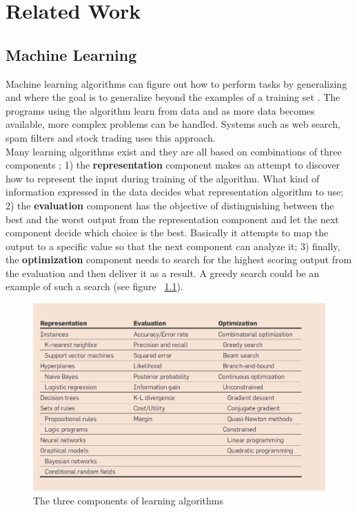 \documentclass[twoside,11pt,openright]{report}
\begin{document}

\chapter{Related Work}
\label{ch:related work}
\section{Machine Learning}
Machine learning algorithms can figure out how to perform tasks by generalizing and where the goal is to generalize beyond the examples of a training set \cite{18}. The programs using the algorithm learn from data and as more data becomes available, more complex problems can be handled. Systems such as web search, spam filters and stock trading uses this approach.
\\[0.5cm]
Many learning algorithms exist and they are all based on combinations of three components \cite{18}; 1) the \textbf{representation} component makes an attempt to discover how to represent the input during training of the algorithm. What kind of information expressed in the data decides what representation algorithm to use; 2) the \textbf{evaluation} component has the objective of distinguishing between the best and the worst output from the representation component and let the next component decide which choice is the best. Basically it attempts to map the output to a specific value so that the next component can analyze it; 3) finally, the \textbf{optimization} component needs to search for the highest scoring output from the evaluation and then deliver it as a result. A greedy search could be an example of such a search (see figure ~\ref{fig:threeComponents}).
\begin{figure}[h!]
\centering
\includegraphics[width=0.6\linewidth,natwidth=898,natheight=587]{billeder/Table1-TheComponentsOfLearningAlgorithms.png}
\caption{The three components of learning algorithms \cite{18}}
\label{fig:threeComponents}
\end{figure}
\end{document}
